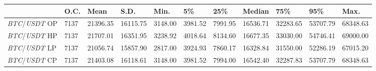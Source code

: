 \begin{tabular}{lllllllllll}
\toprule
 & \textbf{O.C.} & \textbf{Mean} & \textbf{S.D.} & \textbf{Min.} & \textbf{5\%} & \textbf{25\%} & \textbf{Median} & \textbf{75\%} & \textbf{95\%} & \textbf{Max.} \\
\midrule
\emph{BTC}/\emph{USDT} OP & 7137 & 21396.35 & 16115.75 & 3148.00 & 3981.52 & 7991.95 & 16536.71 & 32283.65 & 53707.79 & 68348.63 \\
\emph{BTC}/\emph{USDT} HP & 7137 & 21707.01 & 16351.95 & 3238.92 & 4018.64 & 8134.60 & 16677.35 & 33030.00 & 54746.41 & 69000.00 \\
\emph{BTC}/\emph{USDT} LP & 7137 & 21056.74 & 15857.90 & 2817.00 & 3924.93 & 7860.17 & 16328.84 & 31550.00 & 52286.19 & 67015.20 \\
\emph{BTC}/\emph{USDT} CP & 7137 & 21403.08 & 16118.61 & 3148.00 & 3981.52 & 7994.00 & 16542.40 & 32287.83 & 53707.79 & 68348.63 \\
\bottomrule
\end{tabular}
